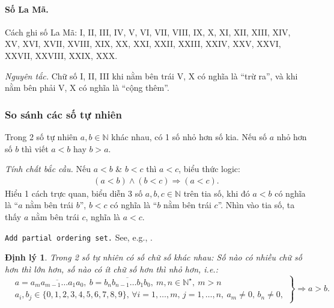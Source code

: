 \documentclass{article}
\numberwithin{equation}{section}
\newtheorem{theorem}{Định lý}[section]
\begin{document}
\paragraph{Số La Mã.} Cách ghi số La Mã: I, II, III, IV, V, VI, VII, VIII, IX, X, XI, XII, XIII, XIV, XV, XVI, XVII, XVIII, XIX, XX, XXI, XXII, XXIII, XXIV, XXV, XXVI, XXVII, XXVIII, XXIX, XXX.

\textit{Nguyên tắc.} Chữ số I, II, III khi nằm bên trái V, X có nghĩa là ``trừ ra'', và khi nằm bên phải V, X có nghĩa là ``cộng thêm''.

\subsubsection{So sánh các số tự nhiên}
Trong 2 số tự nhiên $a,b\in\mathbb{N}$ khác nhau, có 1 số nhỏ hơn số kia. Nếu số $a$ nhỏ hơn số $b$ thì viết $a < b$ hay $b > a$.

\textit{Tính chất bắc cầu.} Nếu $a < b$ \& $b < c$ thì $a < c$, biểu thức logic:
\begin{align*}
	(a < b)\land(b < c)\Rightarrow(a < c).
\end{align*}
Hiểu 1 cách trực quan, biểu diễn 3 số $a,b,c\in\mathbb{N}$ trên tia số, khi đó $a < b$ có nghĩa là ``$a$ nằm bên trái $b$'', $b < c$ có nghĩa là ``$b$ nằm bên trái $c$''. Nhìn vào tia số, ta thấy $a$ nằm bên trái $c$, nghĩa là $a < c$.

\texttt{Add partial ordering set.} See, e.g., \cite{Halmos1960, Halmos1974, Kaplansky1972, Kaplansky1977}.

\begin{theorem}
	Trong 2 số tự nhiên có số chữ số khác nhau: Số nào có nhiều chữ số hơn thì lớn hơn, số nào có ít chữ số hơn thì nhỏ hơn, i.e.:
	\begin{equation}
		\label{compare number of digits}
		\left.\begin{split}
			&a = \overline{a_ma_{m-1}\ldots a_1a_0},\ b = \overline{b_nb_{n-1}\ldots b_1b_0},\ m,n\in\mathbb{N}^\star,\ m > n\\
			&a_i,b_j\in\{0,1,2,3,4,5,6,7,8,9\},\,\forall i = 1,\ldots,m,\,j = 1,\ldots,n,\ a_m\ne 0,\,b_n\ne 0,
		\end{split}\right\}\Rightarrow a > b.		
	\end{equation}
\end{theorem}
\end{document}

